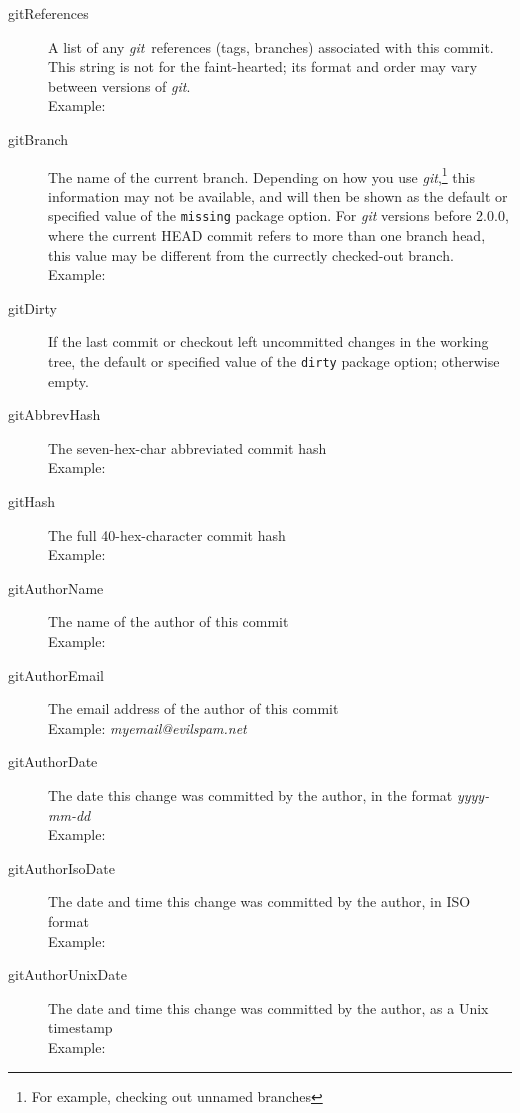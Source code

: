 \documentclass[a4paper,12pt,twoside,openany]{memoir}
\makeatletter
\newcommand{\sfit}[1]{\textit{#1}}
\newcommand{\git}{\sfit{git}}
\newcommand*{\emailat}{@}
\makeatother
\begin{document}
\begin{description}

\item[gitReferences]
    A list of any \git\ references (tags, branches) associated
    with this commit.
    This string is not for the faint-hearted;
    its format and order may vary between versions of \git.\\
    Example:\\\textit{\small\gitReferences}

\item[gitBranch]
    The name of the current branch.
    Depending on how you use \git,\footnote{For example, checking out unnamed branches}
    this information may not be available,
    and will then be shown as the default or specified value of
    the \texttt{missing} package option.
    For \git{} versions before 2.0.0, where the current HEAD commit refers
    to more than one branch head, this value may be different from the
    currectly checked-out branch.\\
    Example: \textit{\gitBranch}

\item[gitDirty]
    If the last commit or checkout left uncommitted changes in the working tree,
    the default or specified value of the \texttt{dirty} package option;
    otherwise empty.

\item[gitAbbrevHash]
    The seven-hex-char abbreviated commit hash\\
    Example: \textit{\gitAbbrevHash}

\item[gitHash]
    The full 40-hex-character commit hash\\
    Example: \textit{\gitHash}

\item[gitAuthorName]
    The name of the author of this commit\\
    Example: \textit{\gitAuthorName}

\item[gitAuthorEmail]
    The email address of the author of this commit\\
    Example: \textit{myemail\emailat evilspam.net}

\item[gitAuthorDate]
    The date this change was committed by the author,
    in the format \textit{yyyy-mm-dd}\\
    Example: \textit{\gitAuthorDate}

\item[gitAuthorIsoDate]
    The date and time this change was committed by the author,
    in ISO format\\
    Example: \textit{\gitAuthorIsoDate}
\clearpage
\item[gitAuthorUnixDate]
    The date and time this change was committed by the author,
    as a Unix timestamp\\
    Example: \textit{\gitAuthorUnixDate}


\end{description}
\end{document}
